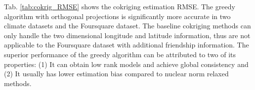 Tab. \ref{tab:cokrig_RMSE} shows the cokriging estimation RMSE. The greedy algorithm with orthogonal projections is significantly more accurate in two climate datasets and the Foursquare dataset. The baseline cokriging methods can only handle the two dimensional longitude and latitude information, thus are not applicable to the Foursquare dataset with additional friendship information. The superior performance of the greedy algorithm can be attributed to two of its properties: (1) It can obtain low rank models and achieve global consistency and (2) It usually has lower estimation bias compared to nuclear norm relaxed methods. %



